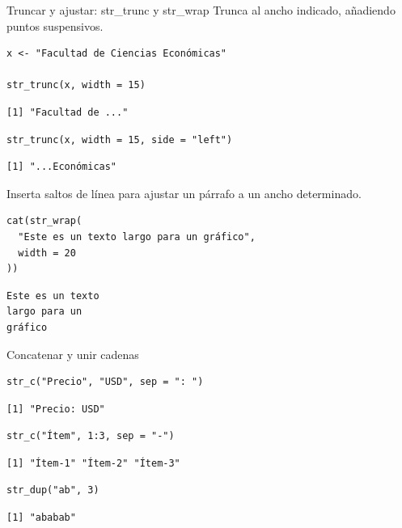 \documentclass[8pt]{beamer}
\begin{document}
\begin{frame}[fragile]{Truncar y ajustar: str\_trunc y str\_wrap}
	Trunca al ancho indicado, añadiendo puntos suspensivos.
\begin{lstlisting}[style=RScript]
x <- "Facultad de Ciencias Económicas"

str_trunc(x, width = 15)
\end{lstlisting}
\begin{lstlisting}[style=RConsole]
[1] "Facultad de ..."
\end{lstlisting}
\begin{lstlisting}[style=RScript]
str_trunc(x, width = 15, side = "left")
\end{lstlisting}
\begin{lstlisting}[style=RConsole]
[1] "...Económicas"
\end{lstlisting}

	Inserta saltos de línea para ajustar un párrafo a un ancho determinado.
\begin{lstlisting}[style=RScript]
cat(str_wrap(
  "Este es un texto largo para un gráfico",
  width = 20
))
\end{lstlisting}
\begin{lstlisting}[style=RConsole]
Este es un texto
largo para un
gráfico
\end{lstlisting}
\end{frame}




\begin{frame}[fragile]{Concatenar y unir cadenas}
\begin{lstlisting}[style=RScript]
str_c("Precio", "USD", sep = ": ")
\end{lstlisting}
\begin{lstlisting}[style=RConsole]
[1] "Precio: USD"
\end{lstlisting}
\begin{lstlisting}[style=RScript]
str_c("Ítem", 1:3, sep = "-")
\end{lstlisting}
\begin{lstlisting}[style=RConsole]
[1] "Ítem-1" "Ítem-2" "Ítem-3"
\end{lstlisting}


\begin{lstlisting}[style=RScript]
str_dup("ab", 3)
\end{lstlisting}
\begin{lstlisting}[style=RConsole]
[1] "ababab"
\end{lstlisting}
\end{frame}
\end{document}
